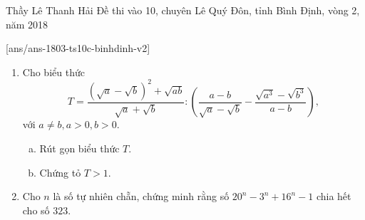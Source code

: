 \begin{name}
{Thầy  Lê Thanh Hải}
{Đề thi vào 10, chuyên Lê Quý Đôn, tỉnh Bình Định, vòng 2, năm 2018}
\end{name}
\setcounter{ex}{0}
[ans/ans-1803-ts10c-binhdinh-v2]

\begin{ex}%
	\vspace{1pt}
	\begin{enumerate}[1.]
		\item Cho biểu thức $$ T=\dfrac{\left( \sqrt{a}-\sqrt{b}\right)^2+\sqrt{ab}}{\sqrt{a}+\sqrt{b}} : \left(\dfrac{a-b}{\sqrt{a}-\sqrt{b}}-\dfrac{\sqrt{a^3}-\sqrt{b^3}}{a-b}\right), $$ với $ a\ne b, a>0,b>0 $.
		\begin{enumerate}[a)]
			\item Rút gọn biểu thức $ T $.
			\item Chứng tỏ $ T >1 $.
		\end{enumerate}
		\item Cho $ n $ là số tự nhiên chẵn, chứng minh rằng số $ 20^n-3^n+16^n-1 $ chia hết cho số $ 323 $.
	\end{enumerate}
\end{ex}
